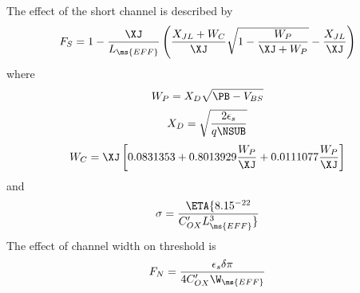 The effect of the short channel is described by
\begin{equation}
F_S = 1 - {\XJ\over{L_{\ms{EFF}}}} \left(
      {{X_{JL} + W_C}\over{\XJ}}
      \sqrt{1 - {{W_P\over{\XJ + W_P}}}} - {{X_{JL}}\over\XJ}\right)
\end{equation}
where
\begin{equation}
W_P = X_D\sqrt{\PB-V_{BS}}
\end{equation}
\begin{equation}
X_D = \sqrt{{2 \epsilon_s}\over q \NSUB} \label{m3:xd:eqn}
\end{equation}
\begin{equation}
W_C = \XJ \left[ 0.0831353 + 0.8013929{{W_P}\over{\XJ}}
      +0.0111077{{W_P}\over{\XJ}} \right]
\end{equation}
and
\begin{equation}
\sigma = \ETA{{8.15 \time 10^{-22}}\over{C'_{OX}L_{\ms{EFF}}^3}}
\label{eqn:m:sigma:l3}
\end{equation}
The effect of channel width on threshold is
\begin{equation}
F_N = {{\textstyle\epsilon_s\delta\pi} \over {\textstyle 4
C'_{OX}\W_{\ms{EFF}}}}
\end{equation}

